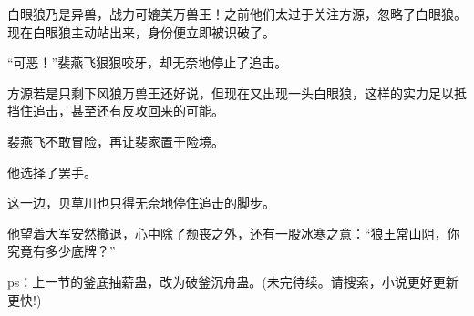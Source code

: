 \begin{this_body}
白眼狼乃是异兽，战力可媲美万兽王！之前他们太过于关注方源，忽略了白眼狼。现在白眼狼主动站出来，身份便立即被识破了。

“可恶！”裴燕飞狠狠咬牙，却无奈地停止了追击。

方源若是只剩下风狼万兽王还好说，但现在又出现一头白眼狼，这样的实力足以抵挡住追击，甚至还有反攻回来的可能。

裴燕飞不敢冒险，再让裴家置于险境。

他选择了罢手。

这一边，贝草川也只得无奈地停住追击的脚步。

他望着大军安然撤退，心中除了颓丧之外，还有一股冰寒之意：“狼王常山阴，你究竟有多少底牌？”

ps：上一节的釜底抽薪蛊，改为破釜沉舟蛊。(未完待续。请搜索，小说更好更新更快!)

\end{this_body}


